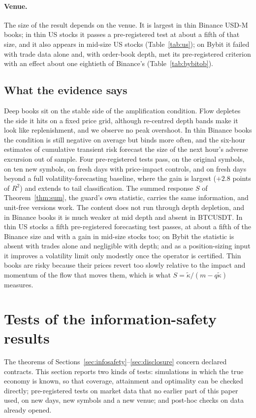 \documentclass[12pt]{article}
\theoremstyle{definition}
\theoremstyle{remark}
\begin{document}
\paragraph{Venue.} The size of the result depends on the venue. It is largest in thin Binance USD-M books; in thin US stocks it passes a pre-registered test at about a fifth of that size, and it also appears in mid-size US stocks (Table~\ref{tab:us}); on Bybit it failed with trade data alone and, with order-book depth, met its pre-registered criterion with an effect about one eightieth of Binance's (Table~\ref{tab:bybitob}).

\subsection{What the evidence says}\label{sec:thin_summary}
Deep books sit on the stable side of the amplification condition. Flow depletes the side it hits on a fixed price grid, although re-centred depth bands make it look like replenishment, and we observe no peak overshoot. In thin Binance books the condition is still negative on average but binds more often, and the six-hour estimates of cumulative transient risk forecast the size of the next hour's adverse excursion out of sample. Four pre-registered tests pass, on the original symbols, on ten new symbols, on fresh days with price-impact controls, and on fresh days beyond a full volatility-forecasting baseline, where the gain is largest ($+2.8$ points of $R^2$) and extends to tail classification. The summed response $S$ of Theorem~\ref{thm:sum}, the guard's own statistic, carries the same information, and unit-free versions work. The content does not run through depth depletion, and in Binance books it is much weaker at mid depth and absent in BTCUSDT. In thin US stocks a fifth pre-registered forecasting test passes, at about a fifth of the Binance size and with a gain in mid-size stocks too; on Bybit the statistic is absent with trades alone and negligible with depth; and as a position-sizing input it improves a volatility limit only modestly once the operator is certified. Thin books are risky because their prices revert too slowly relative to the impact and momentum of the flow that moves them, which is what $S=\tilde\kappa/(m-q\tilde\kappa)$ measures.
\section{Tests of the information-safety results}\label{sec:istests}

The theorems of Sections~\ref{sec:infosafety}--\ref{sec:disclosure} concern declared contracts. This section reports two kinds of tests: simulations in which the true economy is known, so that coverage, attainment and optimality can be checked directly; pre-registered tests on market data that no earlier part of this paper used, on new days, new symbols and a new venue; and post-hoc checks on data already opened.
\end{document}
